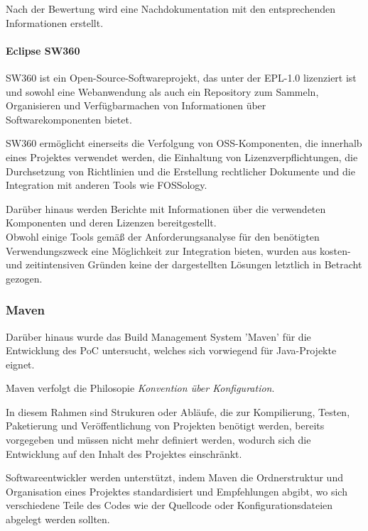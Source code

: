 Nach der Bewertung wird eine Nachdokumentation mit den entsprechenden Informationen erstellt. 

\paragraph{Eclipse SW360}

SW360 ist ein Open-Source-Softwareprojekt, das unter der EPL-1.0 lizenziert ist und sowohl eine Webanwendung als auch ein Repository zum Sammeln, Organisieren und Verfügbarmachen von Informationen über Softwarekomponenten bietet. \cite{the_eclipse_foundation_sw360_2018} 

SW360 ermöglicht einerseits die Verfolgung von OSS-Komponenten, die innerhalb eines Projektes verwendet werden, die Einhaltung von Lizenzverpflichtungen, die Durchsetzung von Richtlinien und die Erstellung rechtlicher Dokumente und die Integration mit anderen Tools wie FOSSology. 

Darüber hinaus werden Berichte mit Informationen über die verwendeten Komponenten und deren Lizenzen bereitgestellt.\\

Obwohl einige Tools gemäß der Anforderungsanalyse für den benötigten Verwendungszweck eine Möglichkeit zur Integration bieten, wurden aus kosten- und zeitintensiven Gründen keine der dargestellten Lösungen letztlich in Betracht gezogen.   

\subsubsection{Maven}

Darüber hinaus wurde das Build Management System 'Maven' für die Entwicklung des PoC untersucht, welches sich vorwiegend für Java-Projekte eignet. 

Maven verfolgt die Philosopie \textit{Konvention über Konfiguration}. 

In diesem Rahmen sind Strukuren oder Abläufe, die zur Kompilierung, Testen, Paketierung und Veröffentlichung von Projekten benötigt werden, bereits vorgegeben und müssen nicht mehr definiert werden, wodurch sich die Entwicklung auf den Inhalt des Projektes einschränkt. \cite[S. 27]{spiller_maven_2011}

Softwareentwickler werden unterstützt, indem Maven die Ordnerstruktur und Organisation eines Projektes standardisiert und Empfehlungen abgibt, wo sich verschiedene Teile des Codes wie der Quellcode oder Konfigurationsdateien abgelegt werden sollten. \cite[S. 2]{varanasi_introducing_2019}  

